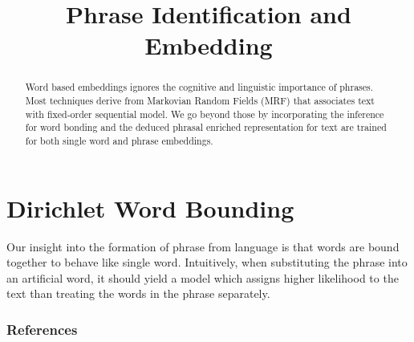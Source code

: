 \documentclass{article} %
\title{Phrase Identification and Embedding}
\begin{document}
\maketitle

\begin{abstract}
Word based embeddings ignores the cognitive and linguistic importance of
phrases. Most techniques derive from Markovian Random Fields (MRF) that
associates text with fixed-order sequential model. We go beyond those by
incorporating the inference for word bonding and the deduced phrasal enriched
representation for text are trained for both single word and phrase embeddings.
\end{abstract}

\section{Dirichlet Word Bounding}
Our insight into the formation of phrase from language is that words are bound
together to behave like single word. Intuitively, when substituting the phrase
into an artificial word, it should yield a model which assigns higher likelihood
to the text than treating the words in the phrase separately. 
\subsubsection{References}

% 

\end{document}

